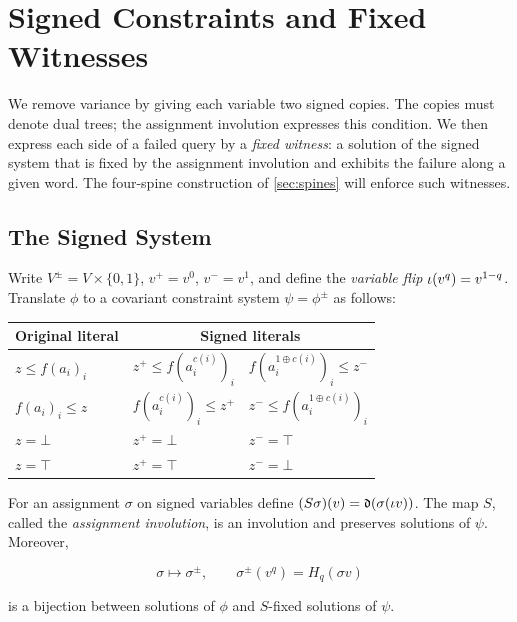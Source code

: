 \section{Signed Constraints and Fixed Witnesses}
\label{sec:variance}

We remove variance by giving each variable two signed copies. The copies
must denote dual trees; the assignment involution expresses this condition.
We then express each side of a failed query by a \emph{fixed witness}: a
solution of the signed system that is fixed by the assignment involution and
exhibits the failure along a given word. The four-spine construction of
\cref{sec:spines} will enforce such witnesses.

\subsection{The Signed System}\label{sec:signed}
Write $V^{\pm}=V\times\{0,1\}$, $v^+=v^0$, $v^-=v^1$, and define the
\emph{variable flip} $\iota(v^q)=v^{1-q}$. Translate $\phi$ to a covariant constraint system
$\psi=\phi^{\pm}$ as follows:

\begin{center}
\begin{tabular}{@{}lll@{}}
\toprule
Original literal & \multicolumn{2}{c}{Signed literals}\\
\midrule
$z\le f(a_i)_i$ & $z^+\le f(a_i^{c(i)})_i$ & $f(a_i^{1\oplus c(i)})_i\le z^-$\\
$f(a_i)_i\le z$ & $f(a_i^{c(i)})_i\le z^+$ & $z^-\le f(a_i^{1\oplus c(i)})_i$\\
$z=\bot$ & $z^+=\bot$ & $z^-=\top$\\
$z=\top$ & $z^+=\top$ & $z^-=\bot$\\
\bottomrule
\end{tabular}
\end{center}

\begin{lemma}\label{lem:signed}
For an assignment $\sigma$ on signed variables define
$(S\sigma)(v)=\mathfrak d(\sigma(\iota v))$. The map $S$, called the
\emph{assignment involution}, is an involution and preserves solutions of $\psi$.
Moreover,

\begin{equation}\label{eq:g14}
\sigma\longmapsto \sigma^{\pm},\qquad \sigma^{\pm}(v^q)=H_q(\sigma v)
\end{equation}

is a bijection between solutions of $\phi$ and $S$-fixed solutions of
$\psi$.
\end{lemma}

